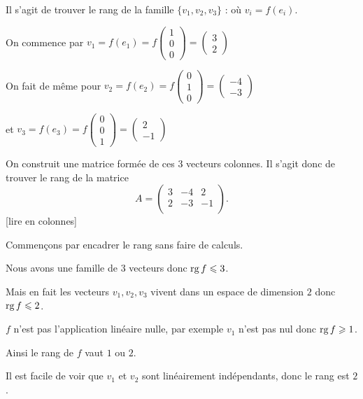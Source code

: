 \change
Il s'agit de trouver le rang de la famille $\{v_1,v_2,v_3\}$ :
où $v_i = f(e_i)$.

On commence par $v_1 = f(e_1) = f\left(\begin{smallmatrix} 1 \\ 0 \\ 0\end{smallmatrix}\right) 
= \left(\begin{smallmatrix} 3 \\ 2 \end{smallmatrix}\right)$

\change
On fait de même pour $v_2 = f(e_2) = f\left(\begin{smallmatrix} 0 \\ 1 \\ 0\end{smallmatrix}\right) 
= \left(\begin{smallmatrix} -4 \\ -3 \end{smallmatrix}\right)$

\change
et $v_3 = f(e_3) = f\left(\begin{smallmatrix} 0 \\ 0 \\ 1 \end{smallmatrix}\right) 
= \left(\begin{smallmatrix} 2 \\ -1 \end{smallmatrix}\right)$

\change
On construit une matrice formée de ces $3$ vecteurs colonnes.
Il s'agit donc de trouver le rang de la matrice 
$$A = \begin{pmatrix}
3 & -4 & 2 \\
2 & -3 & -1 \\
\end{pmatrix}.$$
[lire en colonnes]

\change
Commençons par encadrer le rang sans faire de calculs.

Nous avons une famille de $3$ vecteurs donc $\mathop{\text{rg}}\nolimits f \leqslant 3$.

\change
 Mais en fait les vecteurs $v_1,v_2,v_3$ vivent dans un espace de dimension $2$ donc 
  $\mathop{\text{rg}}\nolimits f \leqslant 2$.
  
\change
$f$ n'est pas l'application linéaire nulle, par exemple $v_1$ n'est pas nul
  donc $\mathop{\text{rg}}\nolimits f \geqslant 1$.
  
\change
Ainsi le rang de $f$ vaut $1$ ou $2$.

\change
Il est facile de voir que $v_1$ et $v_2$ sont linéairement indépendants, donc
le rang est $2$.

